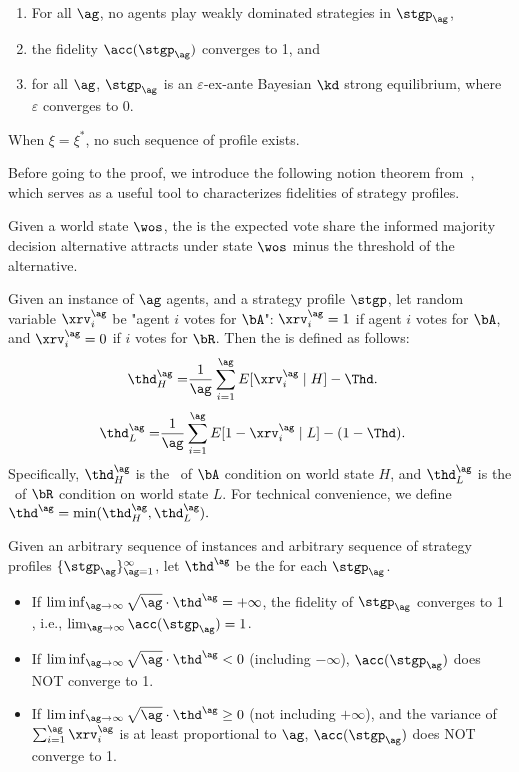 \begin{theorem}
    \begin{enumerate}
        \item For all $\ag$, no agents play weakly dominated strategies in $\stgp_\ag$,
        \item the fidelity $\acc(\stgp_\ag)$ converges to 1, and
        \item for all $\ag$, $\stgp_\ag$ is an $\varepsilon$-ex-ante Bayesian $\kd$ strong equilibrium, where $\varepsilon$ converges to 0.
    \end{enumerate}
    When $\xi = \xi^*$, no such sequence of profile exists. 
\end{theorem}


Before going to the proof, we introduce the following notion theorem from~\citep{han2023wisdom}, which serves as a useful tool to characterizes fidelities of strategy profiles. 

Given a world state $\wos$, the \exshare{} is the expected vote share the informed majority decision alternative attracts under state $\wos$ minus the threshold of the alternative. 
\begin{definition}
   Given an instance of $\ag$ agents, and a strategy profile $\stgp$, let random variable $\xrv_{i}^{\ag}$ be "agent $i$ votes for $\bA$":  $\xrv_{i}^{\ag} = 1$ if agent $i$ votes for $\bA$, and $\xrv_{i}^{\ag} = 0$ if $i$ votes for $\bR$. Then the \exshare{} is defined as follows: 
\begin{align}
    \thd^{\ag}_{H} =& \frac{1}{\ag}\sum_{i=1}^{\ag}E[\xrv_{i}^{\ag}\mid H] - \Thd.\label{eq:hthdh}
\end{align}
\begin{align}
    \thd^{\ag}_{L} =&  \frac{1}{\ag}\sum_{i=1}^{\ag}E[1-\xrv_{i}^{\ag}\mid L] - (1-\Thd)\label{eq:hthdl}. 
\end{align}
Specifically, $\thd_H^{\ag}$ is the \exshare\ of $\bA$ condition on world state $H$, and $\thd_L^{\ag}$ is the \exshare\ of $\bR$ condition on world state $L$. For technical convenience, we define $\thd^{\ag} = \min(\thd^{\ag}_H, \thd^{\ag}_L).$ 
\end{definition}

\begin{theorem}
\label{thm:arbitrary}
Given an arbitrary sequence of instances and arbitrary sequence of strategy profiles $\{\stgp_{\ag}\}_{\ag=1}^\infty$, let $\thd^\ag$ be the \exshare{} for each $\stgp_{\ag}$.
\begin{itemize}
     \item If $\liminf_{\ag\to\infty} \sqrt{\ag}\cdot \thd^{\ag} = +\infty$, the fidelity of $\stgp_{\ag}$ converges to 1 , i.e., $\lim_{\ag\to\infty} \acc(\stgp_{\ag}) = 1$. 
     \item If $\liminf_{\ag\to\infty} \sqrt{\ag}\cdot \thd^{\ag} < 0$ (including $-\infty$), $\acc(\stgp_{\ag})$ does NOT converge to 1. 
     \item If $\liminf_{\ag\to\infty} \sqrt{\ag}\cdot \thd^{\ag} \ge 0$ (not including $+\infty$), and the variance of $\sum_{i=1}^{\ag} \xrv_{i}^{\ag}$ is at least proportional to $\ag$,  $\acc(\stgp_{\ag})$ does NOT converge to 1. 
\end{itemize}
\end{theorem}

